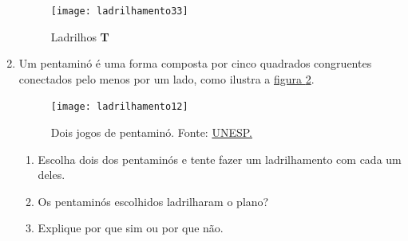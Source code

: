 \begin{enumerate}
	\begin{figure}[H]
	\centering
	\texttt{[image: ladrilhamento33]}
	\caption{Ladrilhos \textbf{T}}
	\label{ladt}
	\end{figure}

\item  Um pentaminó é uma forma composta por cinco quadrados congruentes conectados pelo menos por um lado, como ilustra a \hyperref[pentamino]{figura \ref{pentamino}}.

	\begin{figure}[H]
	\centering
	\texttt{[image: ladrilhamento12]}
	\caption{Dois jogos de pentaminó. Fonte: \href{https://www.ibilce.unesp.br/departamentos/matematica/eventos/3-cejta/regra-dos-jogos/9-ano---pentamino/}{UNESP.}}
	\label{pentamino}
	\end{figure}
	
	\begin{enumerate}
		\item Escolha dois dos pentaminós e tente fazer um ladrilhamento com cada um deles.
		\item Os pentaminós escolhidos ladrilharam o plano?
		\item Explique por que sim ou por que não.
	\end{enumerate}


	
	
\end{enumerate}






